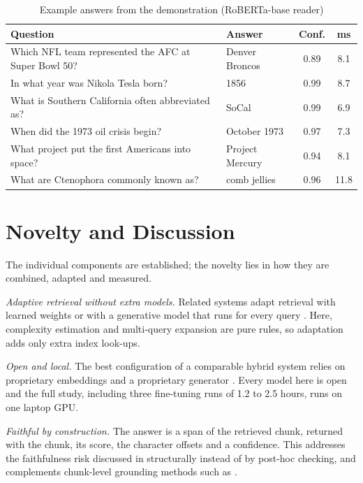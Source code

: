 \documentclass[conference]{IEEEtran}
\begin{document}
\begin{table}[t]
\centering
\caption{Example answers from the demonstration (RoBERTa-base reader)}
\label{tab:examples}
\footnotesize
\setlength{\tabcolsep}{3pt}
\begin{tabular}{@{}p{}p{}cc@{}}
\toprule
\textbf{Question} & \textbf{Answer} & \textbf{Conf.} & \textbf{ms} \\
\midrule
Which NFL team represented the AFC at Super Bowl 50? & Denver Broncos & 0.89 & 8.1 \\
In what year was Nikola Tesla born? & 1856 & 0.99 & 8.7 \\
What is Southern California often abbreviated as? & SoCal & 0.99 & 6.9 \\
When did the 1973 oil crisis begin? & October 1973 & 0.97 & 7.3 \\
What project put the first Americans into space? & Project Mercury & 0.94 & 8.1 \\
What are Ctenophora commonly known as? & comb jellies & 0.96 & 11.8 \\
\bottomrule
\end{tabular}
\end{table}

\section{Novelty and Discussion}

The individual components are established; the novelty lies in how they are combined, adapted
and measured.

\emph{Adaptive retrieval without extra models.} Related systems adapt retrieval with learned
weights \cite{bindle2025} or with a generative model that runs for every query
\cite{mageshwari2026}. Here, complexity estimation and multi-query expansion are pure rules,
so adaptation adds only extra index look-ups.

\emph{Open and local.} The best configuration of a comparable hybrid system relies on
proprietary embeddings and a proprietary generator \cite{khan2026}. Every model here is open and
the full study, including three fine-tuning runs of 1.2 to 2.5 hours, runs on one laptop GPU.

\emph{Faithful by construction.} The answer is a span of the retrieved chunk, returned with the
chunk, its score, the character offsets and a confidence. This addresses the faithfulness risk
discussed in \cite{malin2025} structurally instead of by post-hoc checking, and complements
chunk-level grounding methods such as \cite{vake2025}.
\end{document}
